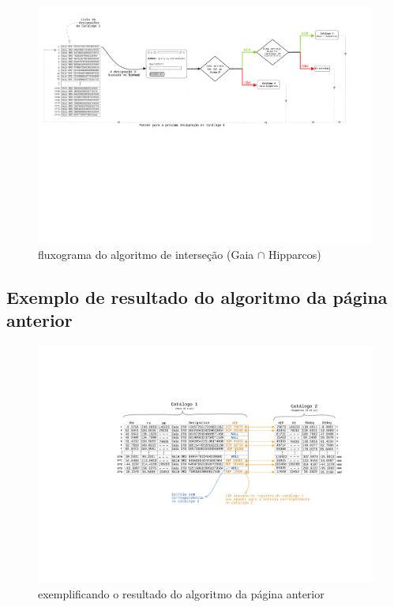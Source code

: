 \documentclass{article}
\begin{document}
	
	\begin{figure}[h]
		\centering
		\includegraphics[width=\textwidth, trim = 0cm 9cm 0cm 1cm, clip]{diagramintersection.pdf}
		\caption*{\scriptsize fluxograma do algoritmo de interseção (Gaia $\cap$ Hipparcos)}
	\end{figure}

	\newpage
	\begin{center}
		\section*{\small Exemplo de resultado do algoritmo da página anterior}
	\end{center}
	\vspace{50pt}	
	
	
	\begin{figure}[h]
		\centering
		\includegraphics[width=\textwidth, trim = 7cm 6.8cm 2.7cm 5cm, clip]{exemplificando.pdf}
		\caption*{\scriptsize exemplificando o resultado do algoritmo da página anterior}
	\end{figure}
	
	
\end{document}
